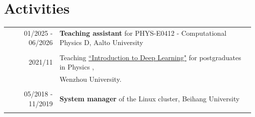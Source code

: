 \documentclass[a4paper,10pt]{article} %
\begin{document}
\section{Activities}
\begin{tabular}{r|l}	
	01/2025 - 06/2026                       & \textbf{Teaching assistant}  for PHYS-E0412 - Computational Physics D, Aalto University\\
	\multicolumn{2}{c}{} \\ %

	2021/11                        & Teaching \href{https://github.com/way2ml/forum/discussions/13}{``Introduction to Deep Learning"} for postgraduates in Physics ,\\ & Wenzhou University.\\
	\multicolumn{2}{c}{} \\	%
	 
	
	
	
	05/2018 - 11/2019                     & \textbf{System manager} of the Linux cluster,  Beihang University\\
	\multicolumn{2}{c}{} \\	%
	
\end{tabular}
\end{document}
